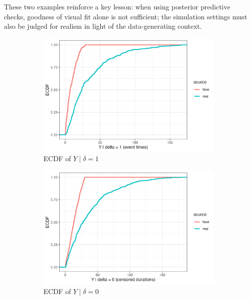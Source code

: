 These two examples reinforce a key lesson: when using posterior predictive checks, goodness of visual fit alone is not sufficient; the simulation settings must also be judged for realism in light of the data-generating context.
\begin{figure}[htbp]
\centering
\begin{subfigure}[t]{0.32\textwidth}
  \centering
  \includegraphics[width=\linewidth]{images/ppc_event_ecdf_A30.png}  %
  \caption{ECDF of $Y \mid \delta=1$}
  \label{fig:ecdf-event}
\end{subfigure}\hfill
\begin{subfigure}[t]{0.32\textwidth}
  \centering
  \includegraphics[width=\linewidth]{images/ppc_censored_ecdf_A30.png}   
  \caption{ECDF of $Y \mid \delta=0$}
  \label{fig:ecdf-cens}
\end{subfigure}\hfill
\begin{subfigure}[t]{0.35\textwidth}

\end{subfigure}
\end{figure}
